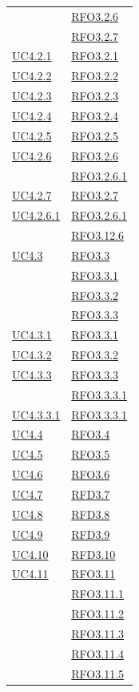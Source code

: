 \begin{longtable}{|>{\centering}m{5cm}|m{5cm}<{\centering}|}
& \hyperlink{RFO3.2.6}{RFO3.2.6}\\
& \hyperlink{RFO3.2.7}{RFO3.2.7}\\ \hline
\hyperref[UC4.2.1]{UC4.2.1} & \hyperlink{RFO3.2.1}{RFO3.2.1}\\ \hline
\hyperref[UC4.2.2]{UC4.2.2} & \hyperlink{RFO3.2.2}{RFO3.2.2}\\ \hline
\hyperref[UC4.2.3]{UC4.2.3} & \hyperlink{RFO3.2.3}{RFO3.2.3}\\ \hline
\hyperref[UC4.2.4]{UC4.2.4} & \hyperlink{RFO3.2.4}{RFO3.2.4}\\ \hline
\hyperref[UC4.2.5]{UC4.2.5} & \hyperlink{RFO3.2.5}{RFO3.2.5}\\ \hline
\hyperref[UC4.2.6]{UC4.2.6} & \hyperlink{RFO3.2.6}{RFO3.2.6}\\
& \hyperlink{RFO3.2.6.1}{RFO3.2.6.1}\\ \hline
\hyperref[UC4.2.7]{UC4.2.7} & \hyperlink{RFO3.2.7}{RFO3.2.7}\\ \hline
\hyperref[UC4.2.6.1]{UC4.2.6.1} & \hyperlink{RFO3.2.6.1}{RFO3.2.6.1}\\ & \hyperlink{RFO3.12.6}{RFO3.12.6}\\ \hline
\hyperref[UC4.3]{UC4.3} & \hyperlink{RFO3.3}{RFO3.3}\\
& \hyperlink{RFO3.3.1}{RFO3.3.1}\\
& \hyperlink{RFO3.3.2}{RFO3.3.2}\\
& \hyperlink{RFO3.3.3}{RFO3.3.3}\\ \hline
\hyperref[UC4.3.1]{UC4.3.1} & \hyperlink{RFO3.3.1}{RFO3.3.1}\\ \hline
\hyperref[UC4.3.2]{UC4.3.2} & \hyperlink{RFO3.3.2}{RFO3.3.2}\\ \hline
\hyperref[UC4.3.3]{UC4.3.3} & \hyperlink{RFO3.3.3}{RFO3.3.3}\\
& \hyperlink{RFO3.3.3.1}{RFO3.3.3.1}\\ \hline
\hyperref[UC4.3.3.1]{UC4.3.3.1} & \hyperlink{RFO3.3.3.1}{RFO3.3.3.1}\\ \hline
\hyperref[UC4.4]{UC4.4} & \hyperlink{RFO3.4}{RFO3.4}\\ \hline
\hyperref[UC4.5]{UC4.5} & \hyperlink{RFO3.5}{RFO3.5}\\ \hline
\hyperref[UC4.6]{UC4.6} & \hyperlink{RFO3.6}{RFO3.6}\\ \hline
\hyperref[UC4.7]{UC4.7} & \hyperlink{RFD3.7}{RFD3.7}\\ \hline
\hyperref[UC4.8]{UC4.8} & \hyperlink{RFD3.8}{RFD3.8}\\ \hline
\hyperref[UC4.9]{UC4.9} & \hyperlink{RFD3.9}{RFD3.9}\\ \hline
\hyperref[UC4.10]{UC4.10} & \hyperlink{RFD3.10}{RFD3.10}\\ \hline
\hyperref[UC4.11]{UC4.11} & \hyperlink{RFO3.11}{RFO3.11}\\
& \hyperlink{RFO3.11.1}{RFO3.11.1}\\
& \hyperlink{RFO3.11.2}{RFO3.11.2}\\
& \hyperlink{RFO3.11.3}{RFO3.11.3}\\
& \hyperlink{RFO3.11.4}{RFO3.11.4}\\
& \hyperlink{RFO3.11.5}{RFO3.11.5}\\\hline


\end{longtable}
